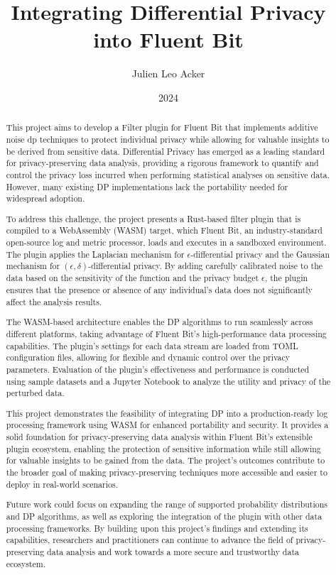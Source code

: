\documentclass[bsc]{report/media/abdnthesis}
\title{Integrating Differential Privacy into Fluent Bit}
\author{Julien Leo Acker}
\date{2024}
\begin{document}
\maketitle
\makedeclaration

\begin{abstract}
This project aims to develop a Filter plugin for Fluent Bit that implements additive noise \acrlong{dp} techniques to protect individual privacy while allowing for valuable insights to be derived from sensitive data. Differential Privacy has emerged as a leading standard for privacy-preserving data analysis, providing a rigorous framework to quantify and control the privacy loss incurred when performing statistical analyses on sensitive data. However, many existing DP implementations lack the portability needed for widespread adoption.

To address this challenge, the project presents a Rust-based filter plugin that is compiled to a WebAssembly (WASM) target, which Fluent Bit, an industry-standard open-source log and metric processor, loads and executes in a sandboxed environment. The plugin applies the Laplacian mechanism for $\epsilon$-differential privacy and the Gaussian mechanism for $(\epsilon, \delta)$-differential privacy. By adding carefully calibrated noise to the data based on the sensitivity of the function and the privacy budget $\epsilon$, the plugin ensures that the presence or absence of any individual's data does not significantly affect the analysis results.

The WASM-based architecture enables the DP algorithms to run seamlessly across different platforms, taking advantage of Fluent Bit's high-performance data processing capabilities. The plugin's settings for each data stream are loaded from TOML configuration files, allowing for flexible and dynamic control over the privacy parameters. Evaluation of the plugin's effectiveness and performance is conducted using sample datasets and a Jupyter Notebook to analyze the utility and privacy of the perturbed data.

This project demonstrates the feasibility of integrating DP into a production-ready log processing framework using WASM for enhanced portability and security. It provides a solid foundation for privacy-preserving data analysis within Fluent Bit's extensible plugin ecosystem, enabling the protection of sensitive information while still allowing for valuable insights to be gained from the data. The project's outcomes contribute to the broader goal of making privacy-preserving techniques more accessible and easier to deploy in real-world scenarios.

Future work could focus on expanding the range of supported probability distributions and DP algorithms, as well as exploring the integration of the plugin with other data processing frameworks. By building upon this project's findings and extending its capabilities, researchers and practitioners can continue to advance the field of privacy-preserving data analysis and work towards a more secure and trustworthy data ecosystem.
\end{abstract}
\end{document}
